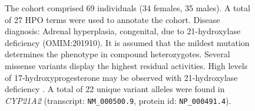 \begin{figure}[htbp]
\vspace{2em}

\caption{ The cohort comprised 69 individuals (34 females, 35 males). A total of 27 HPO terms were used to annotate the cohort. 
Disease diagnosis: Adrenal hyperplasia, congenital, due to 21-hydroxylase deficiency (OMIM:201910).
It is assumed that the mildest mutation determines the phenotype in compound heterozygotes. Several missense variants display the highest residual activities.
High levels of 17-hydroxyprogesterone may be observed with  21-hydroxylase deficiency \cite{PMID_30968594}.
A total of 22 unique variant alleles were found in \textit{CYP21A2} (transcript: \texttt{NM\_000500.9}, protein id: \texttt{NP\_000491.4}).}
\end{figure}

